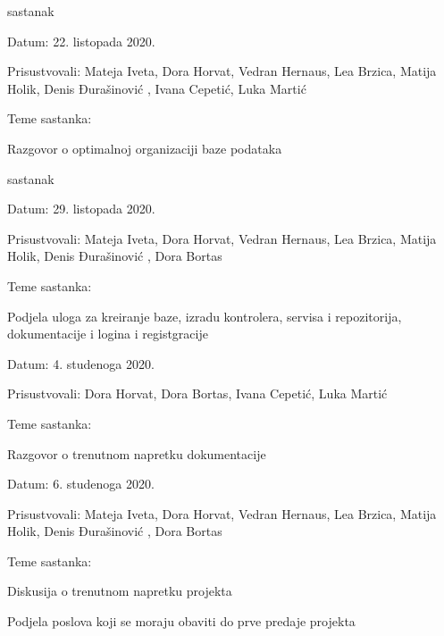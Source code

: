 \begin{packed_enum}
			
				\item  sastanak
				
				\item[] \begin{packed_item}
					\item Datum: 22. listopada 2020.
					\item Prisustvovali: Mateja Iveta, Dora Horvat, Vedran Hernaus, Lea Brzica, Matija Holik, Denis Đurašinović , Ivana Cepetić, Luka Martić
					\item Teme sastanka:
					\begin{packed_item}
						\item Razgovor o optimalnoj organizaciji baze podataka
					\end{packed_item}
				\end{packed_item}
				\item  sastanak
			
			\item[] \begin{packed_item}
				\item Datum: 29. listopada 2020.
				\item Prisustvovali: Mateja Iveta, Dora Horvat, Vedran Hernaus, Lea Brzica, Matija Holik, Denis Đurašinović , Dora Bortas
				\item Teme sastanka:
				\begin{packed_item}
					\item Podjela uloga za kreiranje baze, izradu kontrolera, servisa i repozitorija, dokumentacije i logina i registgracije
				\end{packed_item}
			\end{packed_item}
		\item[] \begin{packed_item}
			\item Datum: 4. studenoga 2020.
			\item Prisustvovali:  Dora Horvat, Dora Bortas, Ivana Cepetić, Luka Martić
			\item Teme sastanka:
			\begin{packed_item}
				\item Razgovor o trenutnom napretku dokumentacije
				
			\end{packed_item}
		\end{packed_item}
		\item[] \begin{packed_item}
			\item Datum: 6. studenoga 2020.
			\item Prisustvovali: Mateja Iveta, Dora Horvat, Vedran Hernaus, Lea Brzica, Matija Holik, Denis Đurašinović , Dora Bortas
			\item Teme sastanka:
			\begin{packed_item}
				\item Diskusija o trenutnom napretku projekta
				\item Podjela poslova koji se moraju obaviti do prve predaje projekta
			\end{packed_item}
		\end{packed_item}
			

\end{packed_enum}
